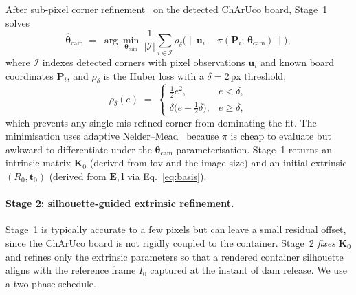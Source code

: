 After sub-pixel corner refinement~\cite{forstner1987fast} on the
detected ChArUco board, Stage~1 solves
\begin{equation}
\label{eq:stage1}
    \hat{\boldsymbol{\theta}}_{\mathrm{cam}}
    \;=\;
    \arg\min_{\boldsymbol{\theta}_{\mathrm{cam}}}\,
    \frac{1}{|\mathcal{I}|}
    \sum_{i \in \mathcal{I}}
    \rho_{\delta}\!\bigl(
      \|\mathbf{u}_{i} - \pi(\mathbf{P}_{i};\,\boldsymbol{\theta}_{\mathrm{cam}})\|
    \bigr),
\end{equation}
where $\mathcal{I}$ indexes detected corners with pixel observations
$\mathbf{u}_{i}$ and known board coordinates $\mathbf{P}_{i}$, and
$\rho_{\delta}$ is the Huber loss with a $\delta = 2$\,px threshold,
\begin{equation}
\label{eq:huber}
    \rho_{\delta}(e)
    \;=\;
    \begin{cases}
        \tfrac{1}{2}e^{2}, & e < \delta, \\
        \delta\bigl(e - \tfrac{1}{2}\delta\bigr), & e \ge \delta,
    \end{cases}
\end{equation}
which prevents any single mis-refined corner from dominating the fit.
The minimisation uses adaptive
Nelder--Mead~\cite{nelder1965simplex,gao2012implementing} because
$\pi$ is cheap to evaluate but awkward to differentiate under the
$\boldsymbol{\theta}_{\mathrm{cam}}$ parameterisation. Stage~1
returns an intrinsic matrix $\mathbf{K}_{0}$ (derived from
$\mathrm{fov}$ and the image size) and an initial extrinsic
$(R_{0}, \mathbf{t}_{0})$ (derived from $\mathbf{E}, \mathbf{l}$
via Eq.~\eqref{eq:basis}).

\paragraph{Stage 2: silhouette-guided extrinsic refinement.}
Stage~1 is typically accurate to a few pixels but can leave a small
residual offset, since the ChArUco board is not rigidly coupled to
the container. Stage~2 \emph{fixes} $\mathbf{K}_{0}$ and refines only the
extrinsic parameters so that a rendered container silhouette
aligns with the reference frame $I_{0}$ captured at the instant
of dam release. We use a two-phase schedule.

